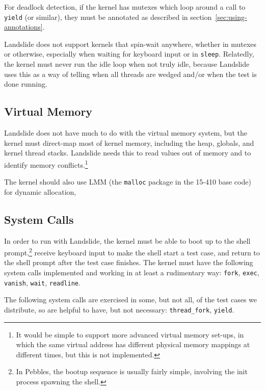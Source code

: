 For deadlock detection, if the kernel has mutexes which loop around a call to \texttt{yield} (or similar), they must be annotated as described in section~\ref{sec:using-annotations}. 

Landslide does not support kernels that spin-wait anywhere, whether in mutexes or otherwise, especially when waiting for keyboard input or in \texttt{sleep}. Relatedly, the kernel must never run the idle loop when not truly idle, because Landslide uses this as a way of telling when all threads are wedged and/or when the test is done running.

\subsection{Virtual Memory}

Landslide does not have much to do with the virtual memory system, but the kernel must direct-map most of kernel memory, including the heap, globals, and kernel thread stacks. Landslide needs this to read values out of memory and to identify memory conflicts.\footnote{
It would be simple to support more advanced virtual memory set-ups, in which the same virtual address has different physical memory mappings at different times, but this is not implemented.}

The kernel should also use LMM (the \texttt{malloc} package in the 15-410 base code) for dynamic allocation, 

\subsection{System Calls}

In order to run with Landslide, the kernel must be able to boot up to the shell prompt,\footnote{
In Pebbles, the bootup sequence is usually fairly simple, involving the init process spawning the shell.}
receive keyboard input to make the shell start a test case, and return to the shell prompt after the test case finishes. The kernel must have the following system calls implemented and working in at least a rudimentary way:
\texttt{fork}, \texttt{exec}, \texttt{vanish}, \texttt{wait}, \texttt{readline}.

The following system calls are exercised in some, but not all, of the test cases we distribute, so are helpful to have, but not necessary:
\texttt{thread\_fork}, \texttt{yield}.

